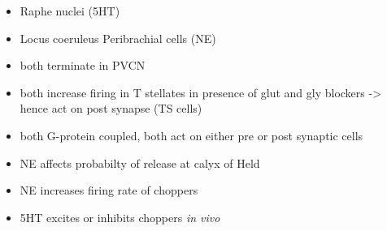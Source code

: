 \begin{itemize}
\item Raphe nuclei (5HT)
\item Locus coeruleus Peribrachial cells (NE)
\item both terminate in PVCN \citep{KlepperHerbert:1991,Thompson:2003,ThompsonLauder:2005,Thompson:2003a,ThompsonWiechmann:2002,BehrensSchofieldEtAl:2002,ThompsonThompson:2001,ThompsonThompson:2001a,ThompsonMooreEtAl:1995,ThompsonThompsonEtAl:1994}
\item both increase firing in T stellates \citep{OertelWrightEtAl:2010} in presence of glut and gly blockers -> hence act on post synapse (TS cells)
\item both G-protein coupled, both act on either pre or post synaptic cells
\item NE affects probabilty of release at calyx of Held
\item NE increases firing rate of choppers \citep{KosslVater:1989,Ebert:1996}
\item 5HT excites or inhibits choppers \emph{in vivo} \citep{EbertOstwald:1992}
\end{itemize}
